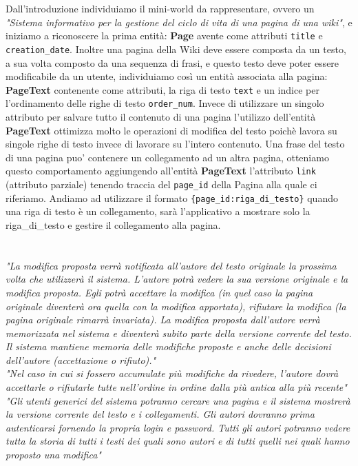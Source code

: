 \documentclass{article}
\begin{document}
		
		Dall'introduzione individuiamo il mini-world da rappresentare, ovvero un \textit{"Sistema informativo per la gestione del ciclo di vita di una pagina di una wiki"}, e iniziamo a riconoscere la prima entità:
		\textbf{Page} avente come attributi \texttt{title} e \texttt{creation\_date}. 
		Inoltre una pagina della Wiki deve essere composta da un testo, a sua volta composto da una sequenza di frasi, e questo testo deve poter essere modificabile da un utente, individuiamo cos\`i un entità associata alla pagina: \textbf {PageText} contenente come attributi, la riga di testo \texttt{text} e un indice per l'ordinamento delle righe di testo \texttt{order\_num}. Invece di utilizzare un singolo attributo per salvare tutto il contenuto di una pagina l'utilizzo dell'entità \textbf{PageText} ottimizza molto le operazioni di modifica del testo poich\`e lavora su singole righe di testo invece di lavorare su l'intero contenuto.
		Una frase del testo di una pagina puo' contenere un collegamento ad un altra pagina, otteniamo questo comportamento aggiungendo all'entità \textbf{PageText} l'attributo \texttt{link} (attributo parziale) tenendo traccia del \texttt{page\_id} della Pagina alla quale ci riferiamo. Andiamo ad utilizzare il formato \texttt{\{page\_id:riga\_di\_testo\}} quando una riga di testo è un collegamento, sarà l'applicativo a mostrare solo la riga\_di\_testo e gestire il collegamento alla pagina.
		\\\\\\
		{\itshape "La modifica proposta verrà notificata all’autore del testo originale la prossima volta che utilizzerà il sistema.
			L’autore potrà vedere la sua versione originale e la modifica proposta. Egli potrà accettare la modifica (in
			quel caso la pagina originale diventerà ora quella con la modifica apportata), rifiutare la modifica (la pagina
			originale rimarrà invariata). La modifica proposta dall’autore verrà memorizzata nel sistema e diventerà
			subito parte della versione corrente del testo. Il sistema mantiene memoria delle modifiche proposte e anche
			delle decisioni dell’autore (accettazione o rifiuto)."}
		\vspace{0.5cm}
		\\
		{\itshape "Nel caso in cui si fossero accumulate più modifiche da rivedere, l’autore dovrà accettarle o rifiutarle tutte
			nell’ordine in ordine dalla più antica alla più recente"}
		\vspace{0.5cm}
		\\
		{\itshape "Gli utenti generici del sistema potranno cercare una pagina e il sistema mostrerà la versione corrente del
			testo e i collegamenti.
			Gli autori dovranno prima autenticarsi fornendo la propria login e password. Tutti gli autori potranno vedere
			tutta la storia di tutti i testi dei quali sono autori e di tutti quelli nei quali hanno proposto una modifica"}
		\vspace{0.5cm}
		
\end{document}
